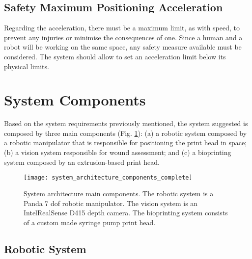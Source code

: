
\subsection{Safety Maximum Positioning Acceleration}
\label{subsec:system_architecture_requirements_safety_max_positioning_acceleration}

Regarding the acceleration, there must be a maximum limit, as with speed, to prevent any injuries or minimise the consequences of one. Since a human and a robot will be working on the same space, any safety measure available must be considered. The system should allow to set an acceleration limit below its physical limits.




\section{System Components}
\label{sec:system_architecture_components}

Based on the system requirements previously mentioned, the system suggested is composed by three main components (Fig. \ref{fig:system_architecture_components}): (a) a robotic system composed by a robotic manipulator that is responsible for positioning the print head in space; (b) a vision system responsible for wound assessment; and (c) a bioprinting system composed by an extrusion-based print head.

\begin{figure}[htbp]
	\centering
	\texttt{[image: system\_architecture\_components\_complete]}
	\caption{System architecture main components. The robotic system is a Panda 7 \gls{dof} robotic manipulator. The vision system is an Intel\textregistered RealSense\texttrademark{} D415 depth camera. The bioprinting system consists of a custom made syringe pump print head.}
	\label{fig:system_architecture_components}
\end{figure}

\subsection*{Robotic System}
\label{subsec:system_architecture_components_robotic_system}

